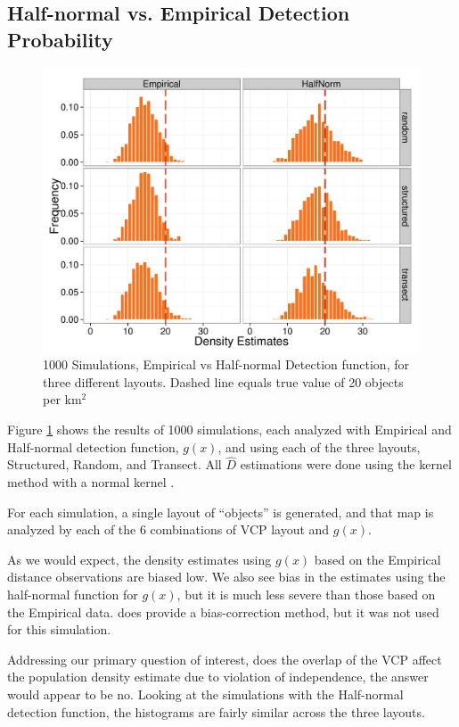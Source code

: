 \documentclass[12pt]{article}
\begin{document}
\subsection{Half-normal vs. Empirical Detection Probability}
\begin{figure}

	\includegraphics[width=\textwidth]{../images/Emp_Vs_Hnorm_1-2.pdf}
	\caption{1000 Simulations, Empirical vs Half-normal Detection function, for three different layouts. Dashed line equals true value of 20 objects per km$^2$\label{fig:sim1}}
		
\end{figure}
Figure \ref{fig:sim1} shows the results of 1000 simulations, each analyzed with Empirical and Half-normal detection function, $g(x)$, and using each of the three layouts, Structured, Random, and Transect. All $\hat{D}$ estimations were done using the kernel method with a normal kernel \parencite{quang1993}.

For each simulation, a single layout of ``objects'' is generated, and that map is analyzed by each of the 6 combinations of VCP layout and $g(x)$. 

As we would expect, the density estimates using $g(x)$ based on the Empirical distance observations are biased low. We also see bias in the estimates using the half-normal function for $g(x)$, but it is much less severe than those based on the Empirical data. \textcite{quang1993} does provide a bias-correction method, but it was not used for this simulation.

Addressing our primary question of interest, does the overlap of the VCP affect the population density estimate due to violation of independence, the answer would appear to be no. Looking at the simulations with the Half-normal detection function, the histograms are fairly similar across the three layouts. 
\end{document}
